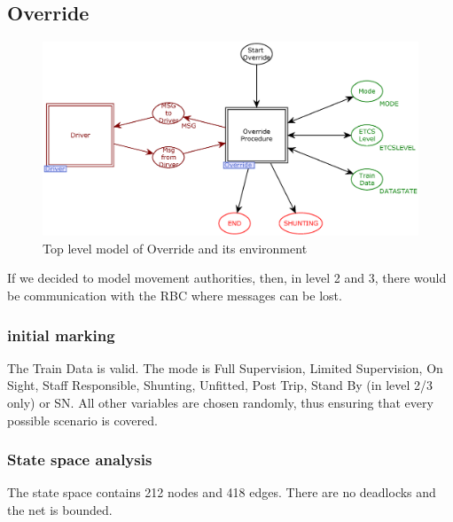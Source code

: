\documentclass{template/openetcs_article}
\begin{document}
\subsection{Override}

\begin{figure}[htb] 
  \centering
  \includegraphics[scale=0.5]{Override-toplevel.eps}
  \caption{Top level model of Override and its environment}
  \label{fig:Override-toplevel}
\end{figure}

If we decided to model movement authorities, then, in level 2 and 3, there would be communication with the RBC where messages can be lost.

\subsubsection{initial marking}
The Train Data is valid.
The mode is Full Supervision, Limited Supervision, On Sight, Staff Responsible, Shunting, Unfitted, Post Trip, Stand By (in level 2/3 only) or SN.
All other variables are chosen randomly, thus ensuring that every possible scenario is covered.

\subsubsection{State space analysis}

The state space contains 212 nodes and 418 edges.
There are no deadlocks and the net is bounded.
 
\end{document}
